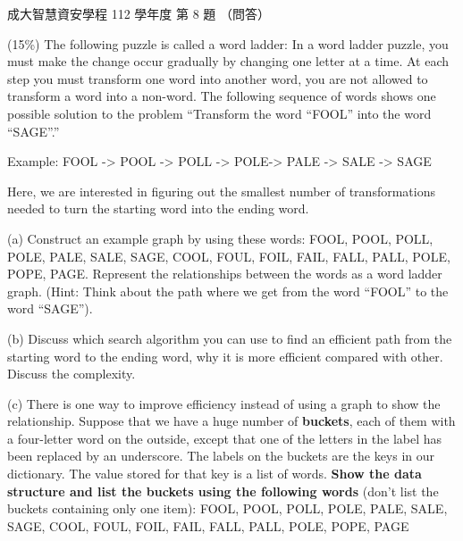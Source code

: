 \begin{pastexam}[label={px:ncku-112-isec-ds-08}]{成大智慧資安學程 112 學年度 第 8 題}
（問答）

(15\%) The following puzzle is called a word ladder: In a word ladder puzzle, you must make the
change occur gradually by changing one letter at a time. At each step you must transform one word
into another word, you are not allowed to transform a word into a non-word. The following sequence
of words shows one possible solution to the problem ``Transform the word ``FOOL'' into the word
``SAGE''.''

\hspace*{1em}Example: FOOL -> POOL -> POLL -> POLE-> PALE -> SALE -> SAGE

Here, we are interested in figuring out the smallest number of transformations needed to turn the
starting word into the ending word.

(a) Construct an example graph by using these words: FOOL, POOL, POLL, POLE, PALE, SALE, SAGE, COOL,
FOUL, FOIL, FAIL, FALL, PALL, POLE, POPE, PAGE. Represent the relationships between the words as a
word ladder graph. (Hint: Think about the path where we get from the word ``FOOL'' to the word
``SAGE'').

(b) Discuss which search algorithm you can use to find an efficient path from the starting word to
the ending word, why it is more efficient compared with other. Discuss the complexity.

(c) There is one way to improve efficiency instead of using a graph to show the relationship.
Suppose that we have a huge number of \textbf{buckets}, each of them with a four-letter word on the
outside, except that one of the letters in the label has been replaced by an underscore. The labels
on the buckets are the keys in our dictionary. The value stored for that key is a list of words.
\textbf{Show the data structure and list the buckets using the following words} (don't list the
buckets containing only one item): FOOL, POOL, POLL, POLE, PALE, SALE, SAGE, COOL, FOUL, FOIL, FAIL,
FALL, PALL, POLE, POPE, PAGE
\end{pastexam}

